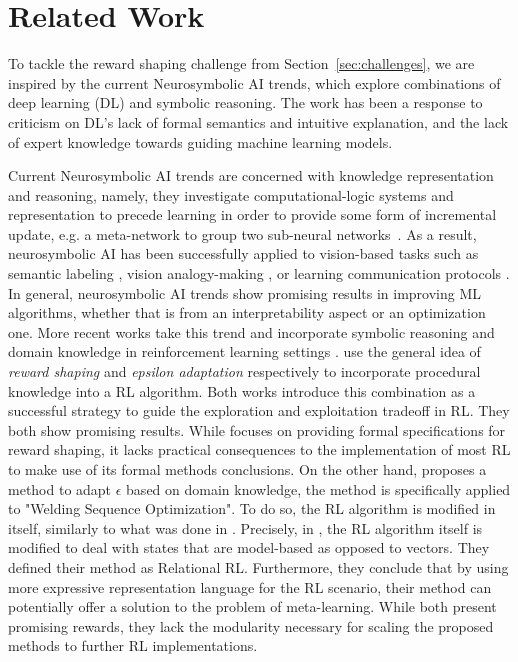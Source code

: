 \section{Related Work}
%
%
To tackle the reward shaping challenge from Section~\ref{sec:challenges}, we are
inspired by the current Neurosymbolic AI trends, which explore
combinations of deep learning (DL) and symbolic reasoning.
%
The work has been a response to criticism on DL's lack of formal
semantics and intuitive explanation, and the lack of expert knowledge
towards guiding machine learning models.

%
%
Current Neurosymbolic AI trends are concerned with knowledge representation and reasoning, namely, they investigate computational-logic systems 
and representation to precede learning in order to provide some form
of incremental update, e.g. a meta-network to group two sub-neural
networks~\cite{Besold2017NeuralSymbolicLA}.
As a result, neurosymbolic AI has been successfully applied to vision-based tasks such as semantic labeling \cite{vinyals2015, karpathy2015}, 
vision analogy-making \cite{Reed2015DeepVA}, or learning communication
protocols \cite{Foerster2016LearningTC}.
%
%
In general, neurosymbolic AI trends show promising results in improving ML algorithms, whether that is from 
an interpretability aspect or an optimization one. More recent works take this trend and incorporate symbolic reasoning and 
domain knowledge in reinforcement learning settings \cite{Driessens2010,Romero2020,achiam2017,marek2010}. \cite{marek2010,Romero2020} use the general idea of \textit{reward shaping} and \textit{epsilon adaptation} respectively 
to incorporate procedural knowledge into a RL algorithm. 
Both works introduce this combination as a successful strategy to guide the exploration and exploitation tradeoff in RL. They both show promising results. While 
\cite{marek2010} focuses on providing formal specifications for reward shaping, it lacks practical 
consequences to the implementation of most RL to make use of its formal methods conclusions. On the other hand, \cite{Romero2020} proposes a method to adapt $\epsilon$ based on domain knowledge, the method is specifically applied to "Welding Sequence Optimization".  
To do so, the RL algorithm is modified in itself, similarly to what was done in \cite{Driessens2010}. Precisely, in \cite{Driessens2010}, the RL algorithm itself is 
modified to deal with states that are model-based as opposed to vectors. They defined their method as Relational RL. 
Furthermore, they conclude that by using more expressive representation language for the RL scenario, their method can potentially offer a solution to the problem of meta-learning. 
While \cite{Romero2020,Driessens2010} both present promising rewards, they lack the modularity necessary for scaling the proposed methods to further RL implementations. 

